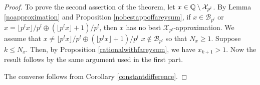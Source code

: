 \documentclass[12pt]{elsarticle}
\theoremstyle{definition}
\newcommand{\mX}{{\mathcal X}}
\newcommand{\f}{{\mathcal F}}
\begin{document}
{\begin{proof}
  			
  			\medskip
  			To prove the second assertion of the theorem, let $x\in \Q\setminus \mX_{p^l}$. By Lemma \ref{noapproximation} and Proposition \ref{nobestappoffareysum}, if $x\in\mathcal{B}_{p^l}$ or $x=\lfloor p^lx\rfloor/p^l\oplus (\lfloor p^lx\rfloor+1)/p^l$, then $x$ has no best $\mX_{p^l}$-approximation. We assume that $x\ne\lfloor p^lx\rfloor/p^l\oplus (\lfloor p^lx\rfloor+1)/p^l$ $x\not\in\mathcal{B}_{p^l}$  so that $N_x\ge1$. 
  			Suppose $k\le N_x$. Then, by Proposition \ref{rationalwithfareysum}, we have $x_{k+1}>1$. Now the result follows by the same argument used in the first part.
  			
  		The	converse follows from Corollary \ref{constantdifference}.
  		\end{proof}
%
% 
%
}
\end{document}
